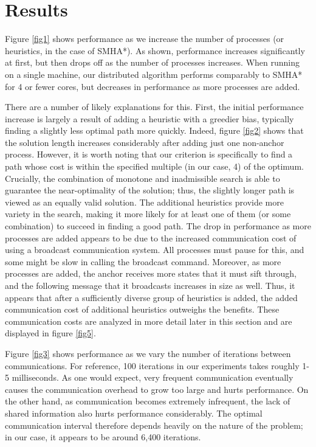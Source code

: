 \documentclass[11pt]{article}
\begin{document}
{\section{Results}

Figure \ref{fig1} shows performance as we increase the number of processes (or heuristics, in the case of SMHA*). As shown, performance increases significantly at first, but then drops off as the number of processes increases. When running on a single machine, our distributed algorithm performs comparably to SMHA* for 4 or fewer cores, but decreases in performance as more processes are added.

There are a number of likely explanations for this. First, the initial performance increase is largely a result of adding a heuristic with a greedier bias, typically finding a slightly less optimal path more quickly. Indeed, figure \ref{fig2} shows that the solution length increases considerably after adding just one non-anchor process. However, it is worth noting that our criterion is specifically to find a path whose cost is within the specified multiple (in our case, 4) of the optimum. Crucially, the combination of monotone and inadmissible search is able to guarantee the near-optimality of the solution; thus, the slightly longer path is viewed as an equally valid solution. The additional heuristics provide more variety in the search, making it more likely for at least one of them (or some combination) to succeed in finding a good path. The drop in performance as more processes are added appears to be due to the increased communication cost of using a broadcast communication system. All processes must pause for this, and some might be slow in calling the broadcast command. Moreover, as more processes are added, the anchor receives more states that it must sift through, and the following message that it broadcasts increases in size as well. Thus, it appears that after a sufficiently diverse group of heuristics is added, the added communication cost of additional heuristics outweighs the benefits. These communication costs are analyzed in more detail later in this section and are displayed in figure \ref{fig5}.

Figure \ref{fig3} shows performance as we vary the number of iterations between communications. For reference, 100 iterations in our experiments takes roughly 1-5 milliseconds. As one would expect, very frequent communication eventually causes the communication overhead to grow too large and hurts performance.  On the other hand, as communication becomes extremely infrequent, the lack of shared information also hurts performance considerably. The optimal communication interval therefore depends heavily on the nature of the problem; in our case, it appears to be around 6,400 iterations.

}
\end{document}
